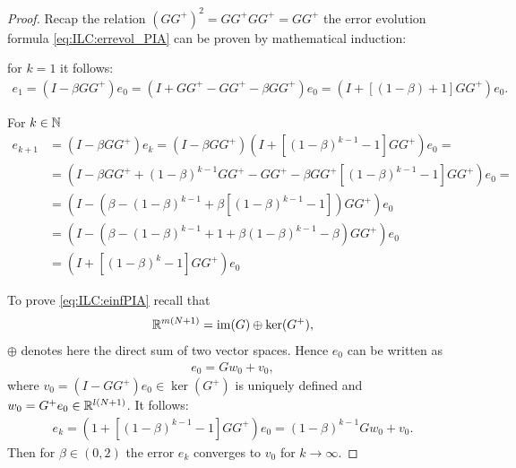 \begin{proof}
	
	Recap the relation $(GG^+)^2 = GG^+GG^+ = GG^+$ the error evolution formula \eqref{eq:ILC:errevol_PIA} can be proven by mathematical induction: 
	
	for $k = 1$ it follows: 
	\begin{align*}
	e_1 = (I - \beta G G^+)e_0 = (I + GG^+ - GG^+ - \beta G G^+)e_0 = (I + \left[(1 - \beta) + 1\right]GG^+)e_0.
	\end{align*}
	
	For $k \in {\mathbb{N}}$  
	\begin{align*}
	e_{k+1} &= ( I - \beta G G^+)e_k = ( I - \beta G G^+) (I+  \left[(1-\beta)^{k-1} - 1\right] G G^+) e_0 = \\
	& = \left(I - \beta G G^+ + (1-\beta)^{k-1}GG^+ - GG^+ - \beta GG^+\left[(1 - \beta)^{k-1} - 1\right]GG^+\right)e_0=\\
	& = \left(I - (\beta - (1-\beta)^{k-1} + \beta\left[(1 - \beta)^{k-1} - 1\right])G G^+\right)e_0\\
	& = \left(I - \left(\beta - (1-\beta)^{k-1} + 1 + \beta(1-\beta)^{k-1} - \beta\right)GG^+\right)e_0\\
	& = (I+  \left[(1-\beta)^k - 1\right] G G^+) e_0
	\end{align*}
	
	To prove \eqref{eq:ILC:einfPIA}  recall that 
	\begin{align*}
	{\mathbb{R}}^{m(N+1)} = \operatorname{im}(G)\oplus \ker (G^+),
	\end{align*}
	$\oplus$ denotes here the direct sum of two vector spaces. 
	Hence $e_0$ can be written as 
	\begin{align*}
	e_0 = G w_0 + v_0,
	\end{align*}
	where $v_0 = (I - G G^+)e_0 \in \ker (G^+)$  is uniquely defined and $w_0 = G^+ e_0 \in {\mathbb{R}}^{l(N+1)}$. It follows: 
	\begin{align*}
	e_{k} = (1+ \left[(1 - \beta)^{k-1} - 1\right]GG^+)e_0 = (1-\beta)^{k-1} G w_0 + v_0.
	\end{align*}
	Then for $\beta \in (0,2)$ the error $e_k$ converges to $v_0$ for $k \to \infty$. 
\end{proof}

